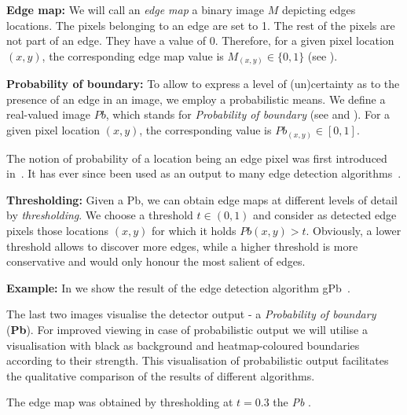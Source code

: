 \textbf{Edge map:} We will call an \textit{edge map} a binary image $M$ depicting edges locations. The pixels belonging to an edge are set to 1. The rest of the pixels are not part of an edge. They have a value of 0. Therefore, for a given pixel location $(x,y)$, the corresponding edge map value is $M_{(x,y)} \in \{0,1\}$ (see ).

\textbf{Probability of boundary:} To allow to express a level of (un)certainty as to the presence of an edge in an image, we employ a probabilistic means. We define a real-valued image $Pb$, which stands for \textit{Probability of boundary} (see  and ). For a given pixel location $(x,y)$, the corresponding value is $Pb_{(x,y)} \in [0,1]$.

The notion of probability of a location being an edge pixel was first introduced in~\cite{martin2004learning}. %
It has ever since been used as an output to many edge detection algorithms~\cite{Maire2008using,LimZD13,DollarICCV13edges,Isola2014crisp,Ganin2014n4fields,Hallman2014}.

\textbf{Thresholding:} Given a Pb, we can obtain edge maps at different levels of detail by {\it thresholding}. We choose a threshold $t\in(0,1)$ and consider as detected edge pixels those locations $(x,y)$ for which it holds %
$Pb(x,y)>t$. Obviously, a lower threshold allows to discover more edges, while a higher threshold is more conservative and would only honour the most salient of edges.

\textbf{Example:} In  we show the result of the edge detection algorithm gPb~\cite{Arbelaez11}.

The last two images visualise the detector output - a {\it Probability of boundary} ({\bf Pb}). For improved viewing in case of probabilistic output we will utilise a visualisation with black as background and heatmap-coloured boundaries according to their strength. This visualisation of probabilistic output facilitates the qualitative comparison of the results of different algorithms. 

The edge map  was obtained by thresholding at $t=0.3$ the {\it Pb} .


